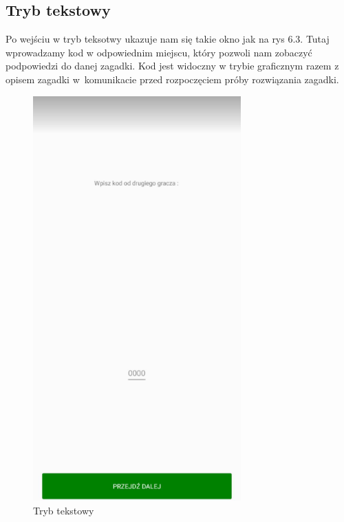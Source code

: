 \subsection{Tryb tekstowy}
Po wejściu w tryb teksotwy ukazuje nam się takie okno jak na rys 6.3. Tutaj wprowadzamy kod w odpowiednim miejscu, który pozwoli nam zobaczyć podpowiedzi do danej zagadki. Kod jest widoczny w trybie graficznym razem z opisem zagadki w~komunikacie przed rozpoczęciem próby rozwiązania zagadki.
	\begin{figure}[!htb]
	\begin{center}
		\includegraphics[width=8cm]{rys/tekstowy0.png}
		\caption{Tryb tekstowy}
		\label{rys:rysunek001}
	\end{center}
\end{figure}

